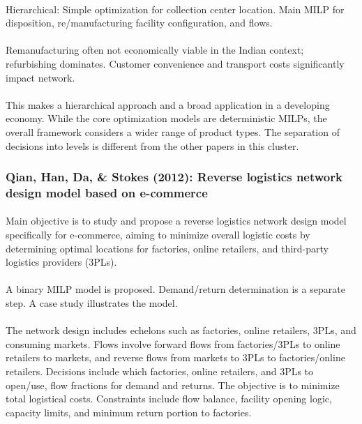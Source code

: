 \paragraph{} Hierarchical: Simple optimization for collection center location. Main MILP for disposition, re/manufacturing facility configuration, and flows.

\paragraph{} Remanufacturing often not economically viable in the Indian context; refurbishing dominates. Customer convenience and transport costs significantly impact network.

\paragraph{} This makes a hierarchical approach and a broad application in a developing economy. While the core optimization models are deterministic MILPs, the overall framework considers a wider range of product types. The separation of decisions into levels is different from the other papers in this cluster.

\subsubsection{Qian, Han, Da, \& Stokes (2012): Reverse logistics network design model based on e-commerce}

\paragraph{} Main objective is to study and propose a reverse logistics network design model specifically for e-commerce, aiming to minimize overall logistic costs by determining optimal locations for factories, online retailers, and third-party logistics providers (3PLs).

\paragraph{} A binary MILP model is proposed. Demand/return determination is a separate step. A case study illustrates the model.

\paragraph{} The network design includes echelons such as factories, online retailers, 3PLs, and consuming markets. Flows involve forward flows from factories/3PLs to online retailers to markets, and reverse flows from markets to 3PLs to factories/online retailers. Decisions include which factories, online retailers, and 3PLs to open/use, flow fractions for demand and returns. The objective is to minimize total logistical costs. Constraints include flow balance, facility opening logic, capacity limits, and minimum return portion to factories.

